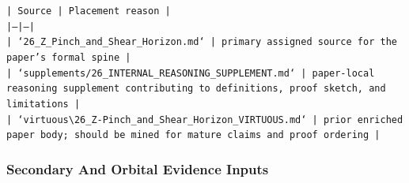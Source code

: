\documentclass[11pt]{article}
\begin{document}
\noindent\texttt{| Source | Placement reason |}\\
\noindent\texttt{|---|---|}\\
\noindent\texttt{| `26\_Z\_Pinch\_and\_Shear\_Horizon.md` | primary assigned source for the paper's formal spine |}\\
\noindent\texttt{| `supplements/26\_INTERNAL\_REASONING\_SUPPLEMENT.md` | paper-local reasoning supplement contributing to definitions, proof sketch, and limitations |}\\
\noindent\texttt{| `virtuous\textbackslash{}26\_Z-Pinch\_and\_Shear\_Horizon\_VIRTUOUS.md` | prior enriched paper body; should be mined for mature claims and proof ordering |}\\

\subsubsection*{Secondary And Orbital Evidence Inputs}
\end{document}

